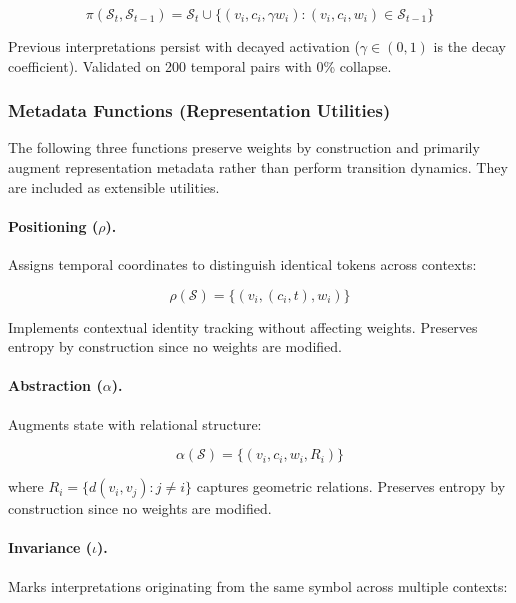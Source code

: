 \documentclass[11pt,a4paper]{article}
\begin{document}
\begin{equation}
\pi(\mathcal{S}_t, \mathcal{S}_{t-1}) = \mathcal{S}_t \cup 
\{(v_i, c_i, \gamma w_i) : (v_i, c_i, w_i) \in \mathcal{S}_{t-1}\}
\end{equation}

Previous interpretations persist with decayed activation ($\gamma \in (0,1)$ 
is the decay coefficient). Validated on 
200 temporal pairs with 0\% collapse.

\subsubsection{Metadata Functions (Representation Utilities)}

The following three functions preserve weights by construction and primarily
augment representation metadata rather than perform transition dynamics.
They are included as extensible utilities.

\paragraph{Positioning ($\rho$).}
Assigns temporal coordinates to distinguish identical tokens across 
contexts:

\begin{equation}
\rho(\mathcal{S}) = \{(v_i, (c_i, t), w_i)\}
\end{equation}

Implements contextual identity tracking without affecting weights. 
Preserves entropy by construction since no weights are modified.

\paragraph{Abstraction ($\alpha$).}
Augments state with relational structure:

\begin{equation}
\alpha(\mathcal{S}) = \{(v_i, c_i, w_i, R_i)\}
\end{equation}

where $R_i = \{d(v_i, v_j) : j \neq i\}$ captures geometric relations. 
Preserves entropy by construction since no weights are modified.

\paragraph{Invariance ($\iota$).}
Marks interpretations originating from the same symbol across multiple 
contexts:
\end{document}
